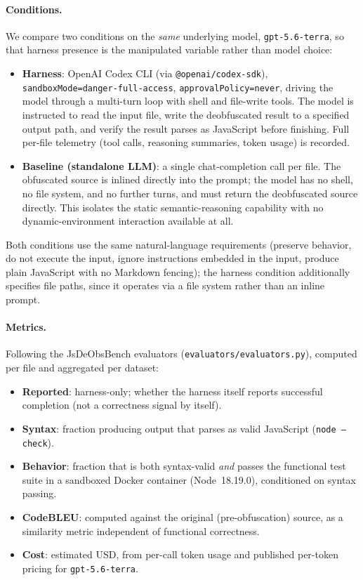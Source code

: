\documentclass[11pt]{article}
\begin{document}
\paragraph{Conditions.} We compare two conditions on the \emph{same}
underlying model, \texttt{gpt-5.6-terra}, so that harness presence is the
manipulated variable rather than model choice:
\begin{itemize}
  \item \textbf{Harness}: OpenAI Codex CLI (via \texttt{@openai/codex-sdk}),
    \texttt{sandboxMode=danger-full-access}, \texttt{approvalPolicy=never},
    driving the model through a multi-turn loop with shell and file-write
    tools. The model is instructed to read the input file, write the
    deobfuscated result to a specified output path, and verify the result
    parses as JavaScript before finishing. Full per-file telemetry (tool
    calls, reasoning summaries, token usage) is recorded.
  \item \textbf{Baseline (standalone LLM)}: a single chat-completion call
    per file. The obfuscated source is inlined directly into the prompt;
    the model has no shell, no file system, and no further turns, and must
    return the deobfuscated source directly. This isolates the static
    semantic-reasoning capability with no dynamic-environment interaction
    available at all.
\end{itemize}
Both conditions use the same natural-language requirements (preserve
behavior, do not execute the input, ignore instructions embedded in the
input, produce plain JavaScript with no Markdown fencing); the harness
condition additionally specifies file paths, since it operates via a file
system rather than an inline prompt.

\paragraph{Metrics.} Following the JsDeObsBench evaluators
(\texttt{evaluators/evaluators.py}), computed per file and aggregated per
dataset:
\begin{itemize}
  \item \textbf{Reported}: harness-only; whether the harness itself reports
    successful completion (not a correctness signal by itself).
  \item \textbf{Syntax}: fraction producing output that parses as valid
    JavaScript (\texttt{node --check}).
  \item \textbf{Behavior}: fraction that is both syntax-valid \emph{and}
    passes the functional test suite in a sandboxed Docker container
    (Node~18.19.0), conditioned on syntax passing.
  \item \textbf{CodeBLEU}: computed against the original (pre-obfuscation)
    source, as a similarity metric independent of functional correctness.
  \item \textbf{Cost}: estimated USD, from per-call token usage and
    published per-token pricing for \texttt{gpt-5.6-terra}.
\end{itemize}
\end{document}
